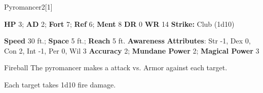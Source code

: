   \begin{monsection}{Pyromancer}{2}[1]
    \vspace{-1em}\vspace{-1em}
    \begin{spellcontent}
      \begin{spelltargetinginfo}
        \pari \textbf{HP} 3;
          \textbf{AD} 2;
          \textbf{Fort} 7;
          \textbf{Ref} 6;
          \textbf{Ment} 8
        \pari \textbf{DR} 0
        \pari \textbf{WR} 14
        \pari \textbf{Strike:}
            Club  (1d10)
      \end{spelltargetinginfo}
    \end{spellcontent}
    \begin{monsterfooter}
      \pari \textbf{Speed} 30 ft.;
        \textbf{Space} 5 ft.;
        \textbf{Reach} 5 ft.
      \pari \textbf{Awareness} 
      \pari \textbf{Attributes}:
        Str -1, Dex 0, Con 2,
        Int -1, Per 0, Wil 3
      \pari \textbf{Accuracy} 2;
        \textbf{Mundane Power} 2;
      \textbf{Magical Power} 3
    \end{monsterfooter}
  \end{monsection}
  \begin{freeability}{Fireball}
      The pyromancer makes a  attack
        vs. Armor against each target.
    
    \hit Each target takes 1d10 fire damage.
    \end{freeability}
  